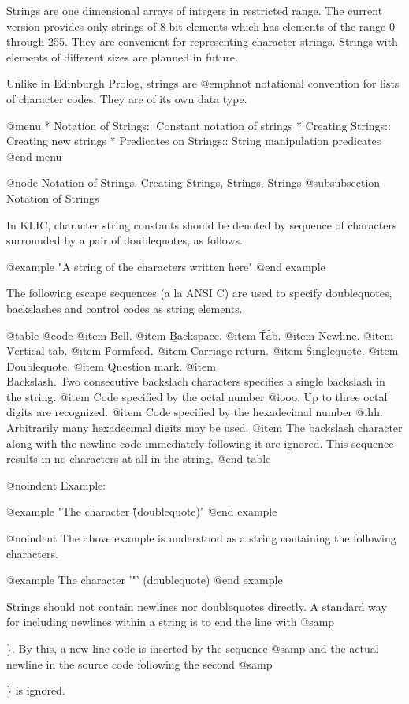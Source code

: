 {{Strings are one dimensional arrays of integers in restricted range.  The
current version provides only strings of 8-bit elements which has
elements of the range 0 through 255.  They are convenient for
representing character strings.  Strings with elements of different
sizes are planned in future.

Unlike in Edinburgh Prolog, strings are @emph{not} notational convention
for lists of character codes.  They are of its own data type.

@menu
* Notation of Strings::         Constant notation of strings
* Creating Strings::            Creating new strings
* Predicates on Strings::       String manipulation predicates
@end menu

@node Notation of Strings, Creating Strings, Strings, Strings
@subsubsection Notation of Strings

In KLIC, character string constants should be denoted by sequence of
characters surrounded by a pair of doublequotes, as follows.

@example
"A string of the characters written here"
@end example

The following escape sequences (a la ANSI C) are used to specify
doublequotes, backslashes and control codes as string elements.

@table @code
@item \a
Bell.
@item \b
Backspace.
@item \t
Tab.
@item \n
Newline.
@item \v
Vertical tab.
@item \f
Formfeed.
@item \r
Carriage return.
@item \'
Singlequote.
@item \"
Doublequote.
@item \?
Question mark.
@item \\
Backslash.  Two consecutive backslach characters specifies a single
backslash in the string.
@item 
Code specified by the octal number @i{ooo}.  Up to three octal digits
are recognized.
@item 
Code specified by the hexadecimal number @i{hh}.  Arbitrarily many
hexadecimal digits may be used.
@item 
The backslash character along with the newline code immediately
following it are ignored.  This sequence results in no characters at all
in the string.
@end table

@noindent
Example:

@example
"The character \'\"\' (doublequote)"
@end example

@noindent
The above example is understood as a string containing the following
characters.

@example
The character '"' (doublequote)
@end example

Strings should not contain newlines nor doublequotes directly.  A
standard way for including newlines within a string is to end the line
with @samp{\n\}.  By this, a new line code is inserted by the sequence
@samp{\n} and the actual newline in the source code following the second
@samp{\} is ignored.

}}}}
